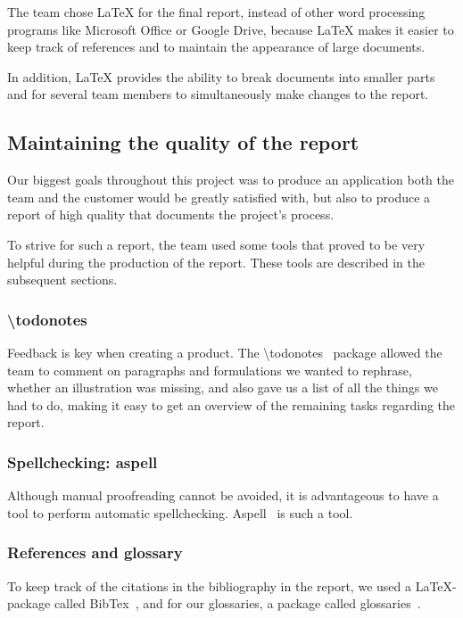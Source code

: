 The team chose LaTeX for the final report, instead of other word processing programs like Microsoft Office or Google Drive, because LaTeX makes it easier to keep track of references and to maintain the appearance of large
documents. 

In addition, LaTeX provides the ability to break documents into smaller parts and for several team members to simultaneously make changes to the report.

\subsection{Maintaining the quality of the report}
Our biggest goals throughout this project was to produce an application both the team and the customer would be greatly satisfied with, but also to produce a report of high quality that documents the project's process. 

To strive for such a report, the team used some tools that proved to be very helpful during the production of the report. These tools are described in the subsequent sections.

\subsubsection{\textbackslash todonotes}
Feedback is key when creating a product. The \textbackslash todonotes~\cite{todo} package allowed the team to comment on paragraphs and formulations we wanted to rephrase, whether an illustration was missing, and also gave us a list of all the things we had to do, making it easy to get an overview of the remaining tasks regarding the report.

\subsubsection{Spellchecking: aspell}
Although manual proofreading cannot be avoided, it is advantageous to have a tool to perform automatic spellchecking. Aspell~\cite{aspell} is such a tool.

\subsubsection{References and glossary}
To keep track of the citations in the bibliography in the report, we used a LaTeX-package called BibTex~\cite{bibtex}, and for our glossaries, a package called glossaries~\cite{glossaries}.


